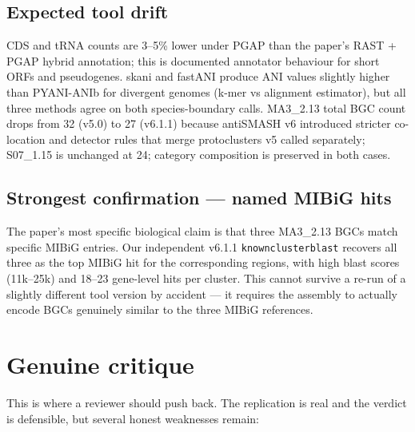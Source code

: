 \documentclass[11pt,letterpaper]{article}
\begin{document}
\subsection{Expected tool drift}
CDS and tRNA counts are 3--5\% lower under PGAP than the paper's RAST + PGAP hybrid annotation; this is documented annotator behaviour for short ORFs and pseudogenes. skani and fastANI produce ANI values slightly higher than PYANI-ANIb for divergent genomes (k-mer vs alignment estimator), but all three methods agree on both species-boundary calls. MA3\_2.13 total BGC count drops from 32 (v5.0) to 27 (v6.1.1) because antiSMASH v6 introduced stricter co-location and detector rules that merge protoclusters v5 called separately; S07\_1.15 is unchanged at 24; category composition is preserved in both cases.

\subsection{Strongest confirmation --- named MIBiG hits}
The paper's most specific biological claim is that three MA3\_2.13 BGCs match specific MIBiG entries. Our independent v6.1.1 \texttt{knownclusterblast} recovers all three as the top MIBiG hit for the corresponding regions, with high blast scores (11k--25k) and 18--23 gene-level hits per cluster. This cannot survive a re-run of a slightly different tool version by accident --- it requires the assembly to actually encode BGCs genuinely similar to the three MIBiG references.

\section{Genuine critique}
\label{sec:critique}

This is where a reviewer should push back. The replication is real and the verdict is defensible, but several honest weaknesses remain:
\end{document}
